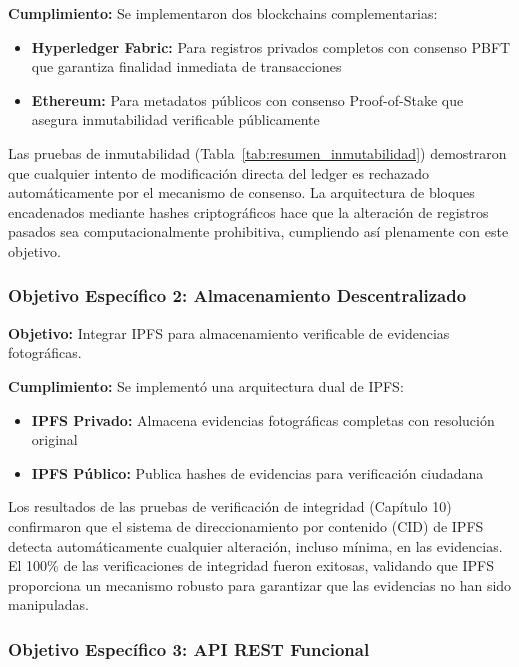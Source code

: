 \textbf{Cumplimiento:} Se implementaron dos blockchains complementarias:
\begin{itemize}
    \item \textbf{Hyperledger Fabric:} Para registros privados completos con consenso PBFT que garantiza finalidad inmediata de transacciones
    \item \textbf{Ethereum:} Para metadatos públicos con consenso Proof-of-Stake que asegura inmutabilidad verificable públicamente
\end{itemize}

Las pruebas de inmutabilidad (Tabla~\ref{tab:resumen_inmutabilidad}) demostraron que cualquier intento de modificación directa del ledger es rechazado automáticamente por el mecanismo de consenso. La arquitectura de bloques encadenados mediante hashes criptográficos hace que la alteración de registros pasados sea computacionalmente prohibitiva, cumpliendo así plenamente con este objetivo.

\subsubsection{Objetivo Específico 2: Almacenamiento Descentralizado}

\textbf{Objetivo:} Integrar IPFS para almacenamiento verificable de evidencias fotográficas.

\textbf{Cumplimiento:} Se implementó una arquitectura dual de IPFS:
\begin{itemize}
    \item \textbf{IPFS Privado:} Almacena evidencias fotográficas completas con resolución original
    \item \textbf{IPFS Público:} Publica hashes de evidencias para verificación ciudadana
\end{itemize}

Los resultados de las pruebas de verificación de integridad (Capítulo 10) confirmaron que el sistema de direccionamiento por contenido (CID) de IPFS detecta automáticamente cualquier alteración, incluso mínima, en las evidencias. El 100\% de las verificaciones de integridad fueron exitosas, validando que IPFS proporciona un mecanismo robusto para garantizar que las evidencias no han sido manipuladas.

\subsubsection{Objetivo Específico 3: API REST Funcional}

